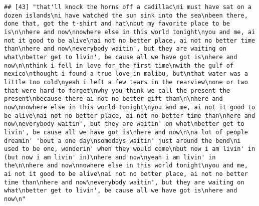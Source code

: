 \documentclass[]{article}
\begin{document}
\begin{verbatim}
## [43] "that'll knock the horns off a cadillac\ni must have sat on a dozen islands\ni have watched the sun sink into the sea\nbeen there, done that, got the t-shirt and hat\nbut my favorite place to be is\n\nhere and now\nnowhere else in this world tonight\nyou and me, ai not it good to be alive\nai not no better place, ai not no better time than\nhere and now\neverybody waitin', but they are waiting on what\nbetter get to livin', be cause all we have got is\nhere and now\n\nthink i fell in love for the first time\nwith the gulf of mexico\nthought i found a true love in malibu, but\nthat water was a little too cold\nyeah i left a few tears in the rearview\none or two that were hard to forget\nwhy you think we call the present the present\nbecause there ai not no better gift than\n\nhere and now\nnowhere else in this world tonight\nyou and me, ai not it good to be alive\nai not no better place, ai not no better time than\nhere and now\neverybody waitin', but they are waitin' on what\nbetter get to livin', be cause all we have got is\nhere and now\n\na lot of people dreamin' 'bout a one day\nsomedays waitin' just around the bend\ni used to be one, wonderin' when they would come\nbut now i am livin' in (but now i am livin' in)\nhere and now\nyeah i am livin' in the\n\nhere and now\nnowhere else in this world tonight\nyou and me, ai not it good to be alive\nai not no better place, ai not no better time than\nhere and now\neverybody waitin', but they are waiting on what\nbetter get to livin', be cause all we have got is\nhere and now\n"                                                                                                                                                                                                                                                                                                                                                                                                                                                                                                                                                                                                                                                                                                                                                                                                                                                                                                                                                                                                                                                                                                                                                                                                                                                                                                                                                                     

\end{verbatim}
\end{document}
